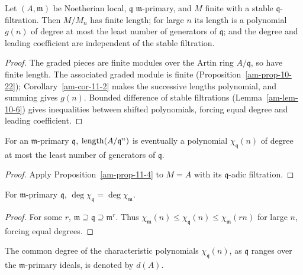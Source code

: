 \begin{proposition}
\label{am-prop-11-4}
\uses{}
Let $(A,\mathfrak{m})$ be Noetherian local, $\mathfrak{q}$ $\mathfrak{m}$-primary, and $M$ finite with a
stable $\mathfrak{q}$-filtration.  Then $M/M_n$ has finite length; for large $n$ its
length is a polynomial $g(n)$ of degree at most the least number of generators
of $\mathfrak{q}$; and the degree and leading coefficient are independent of the stable
filtration.
\end{proposition}
\begin{proof}
The graded pieces are finite modules over the Artin ring $A/\mathfrak{q}$, so have finite
length.  The associated graded module is finite (Proposition~\ref{am-prop-10-22});
Corollary~\ref{am-cor-11-2} makes the successive lengths polynomial, and
summing gives $g(n)$.  Bounded difference of stable filtrations (Lemma~\ref{am-lem-10-6})
gives inequalities between shifted polynomials, forcing equal degree and leading
coefficient.
\end{proof}
\begin{corollary}
\label{am-cor-11-5}
\uses{}
For an $\mathfrak{m}$-primary $\mathfrak{q}$, $\operatorname{length}(A/\mathfrak{q}^n)$ is eventually a polynomial
$\chi_\mathfrak{q}(n)$ of degree at most the least number of generators of $\mathfrak{q}$.
\end{corollary}
\begin{proof}
Apply Proposition~\ref{am-prop-11-4} to $M=A$ with its $\mathfrak{q}$-adic filtration.
\end{proof}
\begin{proposition}
\label{am-prop-11-6}
\uses{}
For $\mathfrak{m}$-primary $\mathfrak{q}$, $\deg\chi_\mathfrak{q}=\deg\chi_\mathfrak{m}$.
\end{proposition}
\begin{proof}
For some $r$, $\mathfrak{m}\supseteq\mathfrak{q}\supseteq\mathfrak{m}^r$.  Thus
$\chi_\mathfrak{m}(n)\le\chi_\mathfrak{q}(n)\le\chi_\mathfrak{m}(rn)$ for large $n$, forcing equal degrees.
\end{proof}
\begin{definition}
\label{am-def-hilbert-dimension}
\uses{}
The common degree of the characteristic polynomials $\chi_\mathfrak{q}(n)$, as $\mathfrak{q}$
ranges over the $\mathfrak{m}$-primary ideals, is denoted by $d(A)$.
\end{definition}
